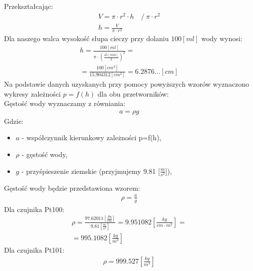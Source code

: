 \documentclass[11pt]{article}
\begin{document}
    \noindent Przekształcając:
    \begin{gather}
        V=\pi\cdot r^2\cdot h\quad \bigg/\ \pi\cdot r^2 \\
        h=\frac{V}{\pi\cdot r^2}
    \end{gather}
    \noindent Dla naszego walca wysokość słupa cieczy przy dolaniu $100 [ml]$ wody wynosi:
    \begin{gather}
        h=\frac{100 [ml]}{\pi\cdot (\frac{45[mm]}{2})^2}=\\
        =\frac{100 [cm^3]}{15.904312 [cm^2]}=6.2876\dots [cm]
    \end{gather}
    \newpage
    Na podstawie danych uzyskanych przy pomocy powyższych wzorów wyznaczono wykresy zależności $p=f(h)$ dla obu
    przetworników:\\
    \noindent{}
    \noindent{}
    \noindent Gęstość wody wyznaczamy z równiania:
    \begin{gather}
        a=\rho g
    \end{gather}
    \noindent Gdzie:
    {\footnotesize
        \begin{itemize}
            \setlength\itemsep{0em}
            \item[] \textbf{$a$} - współczynnik kierunkowy zależności p=f(h),
            \item[] \textbf{$\rho$} - gęstość wody,
            \item[] \textbf{$g$} - przyśpieszenie ziemskie (przyjmujemy 9.81 [$\frac{m}{s^2}$]),
        \end{itemize}}
    \noindent Gęstość wody będzie przedstawiona wzorem:
    \begin{gather}
        \rho=\frac{a}{g}
    \end{gather}
    \noindent Dla czujnika Pt100:
    \begin{gather}
        \rho=\frac{97.62011 [\frac{Pa}{cm}]}{9.81[\frac{m}{s^2}]}=9.951082 [\frac{kg}{cm\cdot m^2}]=\\
        =995.1082 [\frac{kg}{m^3}]
    \end{gather}
    \noindent Dla czujnika Pt101:
    \begin{gather}
        \rho=999.527 [\frac{kg}{m^3}]
    \end{gather}
\end{document}
